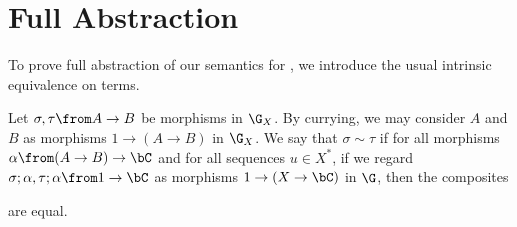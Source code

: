 \section{Full Abstraction}

To prove full abstraction of our semantics for \IAX, we introduce the usual intrinsic equivalence on terms.

\begin{definition}
  Let $\sigma,\tau\from A \to B$ be morphisms in $\G_X$.  
  By currying, we may consider $A$ and $B$ as morphisms $1 \to (A \to B)$ in $\G_X$.
  We say that $\sigma\sim\tau$ if for all morphisms $\alpha\from (A \to B) \to \bC$ and for all sequences $u\in X^*$, if we regard $\sigma;\alpha,\tau;\alpha\from 1 \to \bC$ as morphisms $1 \to (X \to \bC)$ in $\G$, then the composites
  are equal.
\end{definition}

